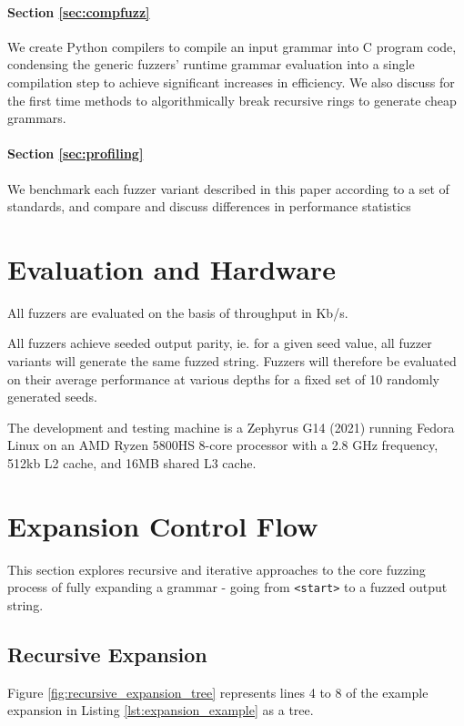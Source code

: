 \documentclass[8pt, twoside]{extarticle}
\begin{document}
\paragraph{Section \ref{sec:compfuzz}} We create Python compilers to compile an input grammar into C program code, condensing the generic fuzzers' runtime grammar evaluation into a single compilation step to achieve significant increases in efficiency. We also discuss for the first time methods to algorithmically break recursive rings to generate cheap grammars.

\paragraph{Section \ref{sec:profiling}} We benchmark each fuzzer variant described in this paper according to a set of standards, and compare and discuss differences in performance statistics

\section{Evaluation and Hardware} \label{sec:hardware}

All fuzzers are evaluated on the basis of throughput in Kb/s. 

All fuzzers achieve seeded output parity, ie. for a given seed value, all fuzzer variants will generate the same fuzzed string. Fuzzers will therefore be evaluated on their average performance at various depths for a fixed set of 10 randomly generated seeds.

The development and testing machine is a Zephyrus G14 (2021) running Fedora Linux on an AMD Ryzen 5800HS 8-core processor with a 2.8 GHz frequency, 512kb L2 cache, and 16MB shared L3 cache.

\section{Expansion Control Flow} \label{sec:excntflw}

This section explores recursive and iterative approaches to the core fuzzing process of fully expanding a grammar - going from \verb|<start>| to a fuzzed output string.

\subsection{Recursive Expansion} \label{sec:recexp}

Figure \ref{fig:recursive_expansion_tree} represents lines 4 to 8 of the example expansion in Listing \ref{lst:expansion_example} as a tree.
\end{document}
